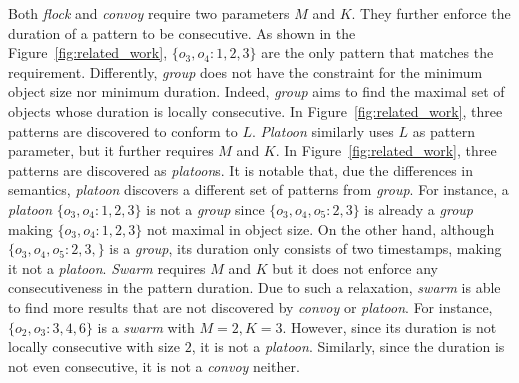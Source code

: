 Both \emph{flock} and \emph{convoy} require two parameters $M$ and $K$. They
further enforce the duration of a pattern to be consecutive. As shown in the
Figure~\ref{fig:related_work}, $\{o_3,o_4:1,2,3\}$ are the only pattern that matches the requirement.
Differently, \emph{group} does not have the constraint for the minimum object size nor minimum duration. 
Indeed, \emph{group} aims to find the maximal set of objects whose duration is 
locally consecutive.
In Figure~\ref{fig:related_work}, three patterns are discovered to conform to $L$.  \emph{Platoon}
similarly uses $L$ as pattern parameter, but it further requires $M$ and $K$. In Figure~\ref{fig:related_work}, 
three patterns are discovered as \emph{platoon}s. It is notable that, due the differences in semantics,
\emph{platoon} discovers a different set of patterns from \emph{group}. For instance, a \emph{platoon} $\{o_3,o_4:1,2,3\}$
is not a \emph{group} since $\{o_3,o_4,o_5:2,3\}$ is already a \emph{group} making $\{o_3,o_4:1,2,3\}$ not maximal in object size.
On the other hand, although $\{o_3,o_4,o_5:2,3,\}$ is a \emph{group}, its
duration only consists of two timestamps, making it not a \emph{platoon}. \emph{Swarm} requires
$M$ and $K$ but it does not enforce any consecutiveness in the pattern duration. 
Due to such a relaxation, \emph{swarm} is able to find more results that
are not discovered by \emph{convoy} or \emph{platoon}. For instance, $\{o_2,o_3:3,4,6\}$ is a \emph{swarm}
with $M=2,K=3$. However, since its duration is not locally consecutive with size $2$, it is not a \emph{platoon}.
Similarly, since the duration is not even consecutive, it is not a \emph{convoy} neither.

